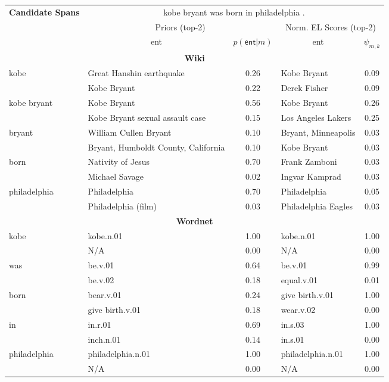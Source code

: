 \begin{table}[t!]
\tiny
\centering
\begin{tabular}{|p{2.4cm}|p{2.8cm}c|p{2.8cm}c|}
\hline
\multirow{3}{*}{\textbf{Candidate Spans}} & \multicolumn{4}{c|}{\textsf{kobe bryant was born in philadelphia . }} \\
& \multicolumn{2}{c}{Priors (top-2)} & \multicolumn{2}{c|}{Norm. EL Scores (top-2)} \\ \cline{2-5}
& \multicolumn{1}{c|}{\textsf{ent}} & $p(\mathsf{ent}|m)$ & \multicolumn{1}{c|}{\textsf{ent}} & $\psi_{m,k}$ \\ \hline 
\multicolumn{5}{c}{\textbf{\textsf{Wiki}}}\\
\hline
\multirow{2}{*}{\textsf{kobe}}& Great Hanshin earthquake & 0.26 & Kobe Bryant & 0.09\\ 
& Kobe Bryant & 0.22 & Derek Fisher & 0.09\\\hline 
\multirow{2}{*}{\textsf{kobe bryant}}& Kobe Bryant & 0.56 & Kobe Bryant & 0.26\\ 
& Kobe Bryant sexual assault case & 0.15 & Los Angeles Lakers & 0.25\\\hline 
\multirow{2}{*}{\textsf{bryant}}& William Cullen Bryant & 0.10 & Bryant, Minneapolis & 0.03\\ 
& Bryant, Humboldt County, California & 0.10 & Kobe Bryant & 0.03\\\hline 
\multirow{2}{*}{\textsf{born}}& Nativity of Jesus & 0.70 & Frank Zamboni & 0.03\\ 
& Michael Savage & 0.02 & Ingvar Kamprad & 0.03\\\hline 
\multirow{2}{*}{\textsf{philadelphia}}& Philadelphia & 0.70 & Philadelphia & 0.05\\ 
& Philadelphia (film) & 0.03 & Philadelphia Eagles & 0.03\\\hline 
\multicolumn{5}{c}{\textbf{\textsf{Wordnet}}}\\
\hline
\multirow{2}{*}{\textsf{kobe}}& kobe.n.01 & 1.00 & kobe.n.01 & 1.00\\ 
& N/A & 0.00 & N/A & 0.00\\\hline 
\multirow{2}{*}{\textsf{was}}& be.v.01 & 0.64 & be.v.01 & 0.99\\ 
& be.v.02 & 0.18 & equal.v.01 & 0.01\\\hline 
\multirow{2}{*}{\textsf{born}}& bear.v.01 & 0.24 & give birth.v.01 & 1.00\\ 
& give birth.v.01 & 0.18 & wear.v.02 & 0.00\\\hline 
\multirow{2}{*}{\textsf{in}}& in.r.01 & 0.69 & in.s.03 & 1.00\\ 
& inch.n.01 & 0.14 & in.s.01 & 0.00\\\hline 
\multirow{2}{*}{\textsf{philadelphia}}& philadelphia.n.01 & 1.00 & philadelphia.n.01 & 1.00\\ 
& N/A & 0.00 & N/A & 0.00\\\hline 
\end{tabular}
\end{table}